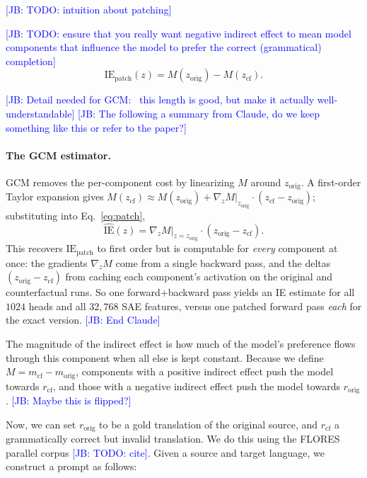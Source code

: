 \documentclass[11pt]{article}
\newcommand{\jb}[1]{\textcolor{blue}{[JB: #1]}}
\begin{document}
\jb{TODO: intuition about patching}

\jb{TODO: ensure that you really want negative indirect effect to mean model components that influence the model to prefer the correct (grammatical) completion}
\begin{equation}
\mathrm{IE}_{\text{patch}}(z) = M(z_{\text{orig}}) - M(z_{\text{cf}}).
\label{eq:patch}
\end{equation}


\jb{Detail needed for GCM: ~this length is good, but make it actually well-understandable}
\jb{The following a summary from Claude, do we keep something like this or refer to the paper?}
\paragraph{The GCM estimator.} GCM \citep{sankaranarayanan2026gcm} removes the
per-component cost by linearizing $M$ around $z_{\text{orig}}$. A first-order
Taylor expansion gives $M(z_{\text{cf}}) \approx M(z_{\text{orig}}) + \nabla_z
M|_{z_{\text{orig}}}\!\cdot(z_{\text{cf}} - z_{\text{orig}})$; substituting into
Eq.~\ref{eq:patch},
\begin{equation}
\widehat{\mathrm{IE}}(z) = \nabla_z M\big|_{z=z_{\text{orig}}} \cdot (z_{\text{orig}} - z_{\text{cf}}).
\label{eq:ie}
\end{equation}
This recovers $\mathrm{IE}_{\text{patch}}$ to first order but is computable for
\emph{every} component at once: the gradients $\nabla_z M$ come from a single
backward pass, and the deltas $(z_{\text{orig}} - z_{\text{cf}})$ from caching
each component's activation on the original and counterfactual runs. So one
forward$+$backward pass yields an IE estimate for all $1024$ heads and all
$32{,}768$ SAE features, versus one patched forward pass \emph{each} for the
exact version.
\jb{End Claude}

The magnitude of the indirect effect is how much of the model's preference flows through this component when all else is kept constant. Because we define $M = m_{\text{cf}} - m_{\text{orig}}$, components with a positive indirect effect push the model towards $r_\text{cf}$, and those with a negative indirect effect push the model towards $r_\text{orig}$. \jb{Maybe this is flipped?}

Now, we can set $r_{\text{orig}}$ to be a gold translation of the original source, and $r_{\text{cf}}$ a grammatically correct but invalid translation. We do this using the FLORES parallel corpus \jb{TODO: cite}. Given a source and target language, we construct a prompt as follows:
\end{document}
